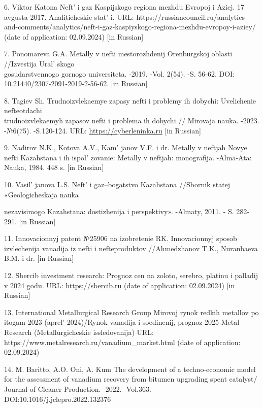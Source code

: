 \begin{references}
6. Viktor Katona Neft'{} i gaz Kaspijskogo regiona mezhdu
Evropoj i Aziej. 17 avgusta 2017. Analiticheskie stat' i.
URL:
https://russiancouncil.ru/analytics-and-comments/analytics/neft-i-gaz-kaspiyskogo-regiona-mezhdu-evropoy-i-aziey/
(date of application: 02.09.2024) {[}in Russian{]}

7. Ponomareva G.A. Metally v nefti mestorozhdenij Orenburgskoj oblasti
//Izvestija Ural' skogo \\gosudarstvennogo gornogo
universiteta. -2019. -Vol. 2(54). -S. 56-62. DOI:
10.21440/2307-2091-2019-2-56-62. {[}in Russian{]}

8. Tagiev Sh. Trudnoizvlekaemye zapasy nefti i problemy ih dobychi:
Uvelichenie nefteotdachi \\trudnoizvlekaemyh zapasov nefti i problema ih
dobychi // Mirovaja nauka. -2023. -№6(75). -S.120-124. URL:
\href{https://cyberleninka.ru/article/n/trudnoizvlekaemye-zapasy-nefti-i-problemy-ih-dobychi-uvelechenie-nefteotdachi-trudnoizvlekaemyh-zapasov-nefti-i-problema-ih-dobychi/viewer}{https://cyberleninka.ru}
{[}in Russian{]}

9. Nadirov N.K., Kotova A.V., Kam' janov V.F. i dr.
Metally v neftjah Novye nefti Kazahstana i ih
ispol' zovanie: Metally v neftjah: monografija.
-Alma-Ata: Nauka, 1984. 448 s. {[}in Russian{]}

10. Vasil' janova L.S. Neft'{} i
gaz--bogatstvo Kazahstana //Sbornik statej «Geologicheskaja nauka

nezavisimogo Kazahstana: dostizhenija i perspektivy». -Almaty, 2011. -
S. 282-291. {[}in Russian{]}

11. Innovacionnyj patent №25906 na izobretenie RK. Innovacionnyj sposob
izvlechenija vanadija iz nefti i nefteproduktov //Ahmedzhanov T.K.,
Nuranbaeva B.M. i dr. {[}in Russian{]}

12. Sbercib investment research: Prognoz cen na zoloto, serebro, platinu
i palladij v 2024 godu. URL:
\href{https://sbercib.ru/publication/prognoz-tsen-na-zoloto-serebro-platinu-i-palladii-v-2024-godu}{https://sbercib.ru}
(date of application: 02.09.2024) {[}in Russian{]}

13. International Metallurgical Research Group Mirovoj rynok redkih
metallov po itogam 2023 (aprel'{} 2024)/Rynok vanadija i
soedinenij, prognoz 2025 Metal Research (Metallurgicheskie
issledovanija) URL: https://www.metalresearch.ru/vanadium\_market.html
(date of application: 02.09.2024)

14. M. Baritto, A.O. Oni, A. Kum The development of a techno-economic
model for the assessment of vanadium recovery from bitumen upgrading
spent catalyst/ Journal of Cleaner Production. -2022. -Vol.363.
DOI:10.1016/j.jclepro.2022.132376


\end{references}
